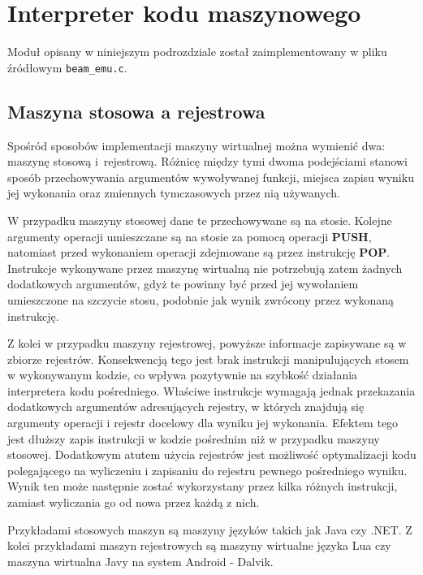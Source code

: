 \section{Interpreter kodu maszynowego}
\label{sec:maszynaInterpreter}

Moduł opisany w niniejszym podrozdziale został zaimplementowany w pliku źródłowym \texttt{beam\_emu.c}.

\subsection{Maszyna stosowa a rejestrowa}
\label{sub:interpreterStosowa}

Spośród sposobów implementacji maszyny wirtualnej można wymienić dwa: maszynę stosową i~rejestrową.
Różnicę między tymi dwoma podejściami stanowi sposób przechowywania argumentów wywoływanej funkcji, miejsca zapisu wyniku jej wykonania oraz zmiennych tymczasowych przez nią używanych.

W przypadku maszyny stosowej dane te przechowywane są na stosie. Kolejne argumenty operacji umieszczane są na stosie za pomocą operacji \textbf{PUSH}, natomiast przed wykonaniem operacji zdejmowane są przez instrukcję \textbf{POP}. Instrukcje wykonywane przez maszynę wirtualną nie potrzebują zatem żadnych dodatkowych argumentów, gdyż te powinny być przed jej wywołaniem umieszczone na szczycie stosu, podobnie jak wynik zwrócony przez wykonaną instrukcję.

Z kolei w przypadku maszyny rejestrowej, powyższe informacje zapisywane są w zbiorze rejestrów.
Konsekwencją tego jest brak instrukcji manipulujących stosem w wykonywanym kodzie, co wpływa pozytywnie na szybkość działania interpretera kodu pośredniego.
Właściwe instrukcje wymagają jednak przekazania dodatkowych argumentów adresujących rejestry, w których znajdują się argumenty operacji i rejestr docelowy dla wyniku jej wykonania.
Efektem tego jest dłuższy zapis instrukcji w kodzie pośrednim niż w przypadku maszyny stosowej.
Dodatkowym atutem użycia rejestrów jest możliwość optymalizacji kodu polegającego na wyliczeniu i zapisaniu do rejestru pewnego pośredniego wyniku.
Wynik ten może następnie zostać wykorzystany przez kilka różnych instrukcji, zamiast wyliczania go od nowa przez każdą z nich.

Przykładami stosowych maszyn są maszyny języków takich jak Java czy .NET.
Z kolei przykładami maszyn rejestrowych są maszyny wirtualne języka Lua czy maszyna wirtualna Javy na system Android - Dalvik.

